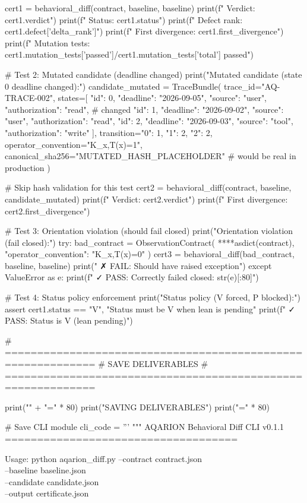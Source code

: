 cert1 = behavioral_diff(contract, baseline, baseline)
print(f"  Verdict: {cert1.verdict}")
print(f"  Status: {cert1.status}")
print(f"  Defect rank: {cert1.defect['delta_rank']}")
print(f"  First divergence: {cert1.first_divergence}")
print(f"  Mutation tests: {cert1.mutation_tests['passed']}/{cert1.mutation_tests['total']} passed")

# Test 2: Mutated candidate (deadline changed)
print("\n[Test 2] Mutated candidate (state 0 deadline changed):")
candidate_mutated = TraceBundle(
    trace_id="AQ-TRACE-002",
    states=[
        {"id": 0, "deadline": "2026-09-05", "source": "user", "authorization": "read"},  # changed
        {"id": 1, "deadline": "2026-09-02", "source": "user", "authorization": "read"},
        {"id": 2, "deadline": "2026-09-03", "source": "tool", "authorization": "write"}
    ],
    transition={"0": 1, "1": 2, "2": 2},
    operator_convention="K_x,T(x)=1",
    canonical_sha256="MUTATED_HASH_PLACEHOLDER"  # would be real in production
)

# Skip hash validation for this test
cert2 = behavioral_diff(contract, baseline, candidate_mutated)
print(f"  Verdict: {cert2.verdict}")
print(f"  First divergence: {cert2.first_divergence}")

# Test 3: Orientation violation (should fail closed)
print("\n[Test 3] Orientation violation (fail closed):")
try:
    bad_contract = ObservationContract(
        **{**asdict(contract), "operator_convention": "K_x,T(x)=0"}
    )
    cert3 = behavioral_diff(bad_contract, baseline, baseline)
    print("  ✗ FAIL: Should have raised exception")
except ValueError as e:
    print(f"  ✓ PASS: Correctly failed closed: {str(e)[:80]}")

# Test 4: Status policy enforcement
print("\n[Test 4] Status policy (V forced, P blocked):")
assert cert1.status == "V", "Status must be V when lean is pending"
print(f"  ✓ PASS: Status is V (lean pending)")

# ============================================================
# SAVE DELIVERABLES
# ============================================================

print("\n" + "=" * 80)
print("SAVING DELIVERABLES")
print("=" * 80)

# Save CLI module
cli_code = '''
"""
AQARION Behavioral Diff CLI v0.1.1
====================================

Usage:
    python aqarion_diff.py --contract contract.json \\
                           --baseline baseline.json \\
                           --candidate candidate.json \\
                           --output certificate.json

